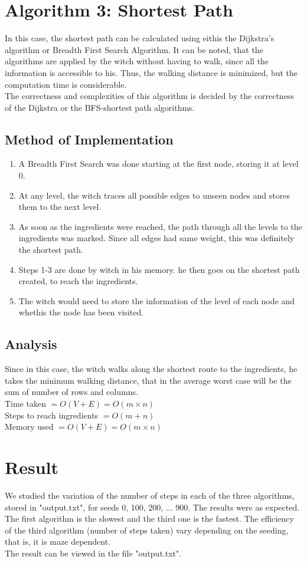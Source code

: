 \documentclass{article} %
\begin{document}
\section{Algorithm 3: Shortest Path}
In this case, the shortest path can be calculated using eithis the Dijkstra's algorithm or Breadth First Search Algorithm. It can be noted, that the algorithms are applied by the witch without having to walk, since all the information is accessible to his. Thus, the walking distance is minimized, but the computation time is considerable.
\\The correctness and complexities of this algorithm is decided by the correctness of the Dijkstra or the BFS-shortest path algorithms.
\subsection{Method of Implementation}
\begin{enumerate}
    \item A Breadth First Search was done starting at the first node, storing it at level 0.
    \item At any level, the witch traces all possible edges to unseen nodes and stores them to the next level.
    \item As soon as the ingredients were reached, the path through all the levels to the ingredients was marked. Since all edges had same weight, this was definitely the shortest path.
    \item Steps 1-3 are done by witch in his memory. he then goes on the shortest path created, to reach the ingredients.
    \item The witch would need to store the information of the level of each node and whethis the node has been visited.
\end{enumerate}
\subsection{Analysis}
Since in this case, the witch walks along the shortest route to the ingredients, he takes the minimum walking distance, that in the average worst case will be the sum of number of rows and columns.
\\Time taken $= O(V+E) = O(m \times n)$
\\Steps to reach ingredients $= O(m + n)$
\\Memory used $= O(V+E) = O(m \times n)$

\section{Result}
We studied the variation of the number of steps in each of the three algorithms, stored in "output.txt", for seeds 0, 100, 200, ... 900. The results were as expected. The first algorithm is the slowest and the third one is the fastest. The efficiency of the third algorithm (number of steps taken) vary depending on the seeding, that is, it is maze dependent.
\\The result can be viewed in the file "output.txt".
\end{document}
